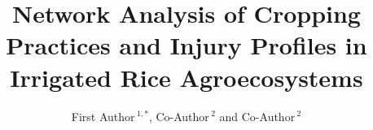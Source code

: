 \documentclass{frontiersSCNS} %
\def\firstAuthorLast{Sample {et~al.}} %
\def\Authors{First Author\,$^{1,*}$, Co-Author\,$^{2}$ and Co-Author\,$^2$}
\begin{document}
\onecolumn
{}

\title[Running Title]{Network Analysis of Cropping Practices and Injury Profiles in Irrigated Rice Agroecosystems} 

\author[\firstAuthorLast]{\Authors} %
\address{} %
\correspondance{} %

\extraAuth{}%


\maketitle

\end{document}
